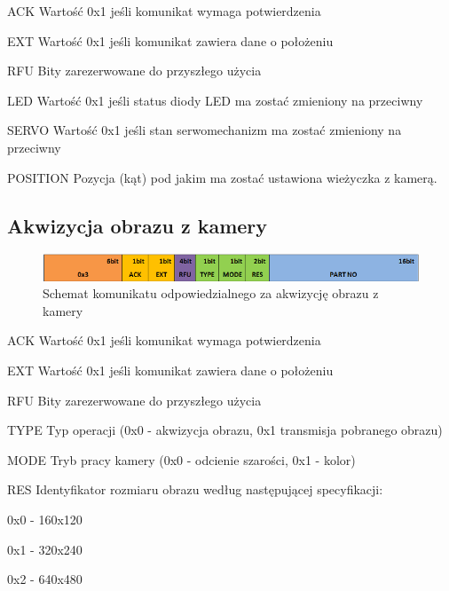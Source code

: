 \begin{basedescript}{\desclabelstyle{\pushlabel}\desclabelwidth{25mm}}
\setlength{\parsep}{0pt}
\setlength{\itemsep}{0mm}
\setlength{\parskip}{0pt}
\item[ACK]
	Wartość 0x1 jeśli komunikat wymaga potwierdzenia
\item[EXT] 
	Wartość 0x1 jeśli komunikat zawiera dane o położeniu
\item[RFU] 
	Bity zarezerwowane do przyszłego użycia
\item[LED] 
	Wartość 0x1 jeśli status diody LED ma zostać zmieniony na przeciwny
\item[SERVO] 
	Wartość 0x1 jeśli stan serwomechanizm ma zostać zmieniony na przeciwny
\item[POSITION] 
	Pozycja (kąt) pod jakim ma zostać ustawiona wieżyczka z kamerą.
\end{basedescript}

\subsection{Akwizycja obrazu z kamery}
\begin{figure}[h!] 
 \centering
 \includegraphics[width=\textwidth]{../images/appendix/cmd_0x03.png}
 \caption{Schemat komunikatu odpowiedzialnego za akwizycję obrazu z kamery}
 \label{fig:CMD_0x03}
\end{figure}

\begin{basedescript}{\desclabelstyle{\pushlabel}\desclabelwidth{25mm}}
\setlength{\parsep}{0pt}
\setlength{\itemsep}{0mm}
\setlength{\parskip}{0pt}
\item[ACK]
	Wartość 0x1 jeśli komunikat wymaga potwierdzenia
\item[EXT] 
	Wartość 0x1 jeśli komunikat zawiera dane o położeniu
\item[RFU] 
	Bity zarezerwowane do przyszłego użycia
\item[TYPE] 
	Typ operacji (0x0 - akwizycja obrazu, 0x1 transmisja pobranego obrazu)
\item[MODE] 
	Tryb pracy kamery (0x0 - odcienie szarości, 0x1 - kolor)
\item[RES] 
	Identyfikator rozmiaru obrazu według następującej specyfikacji:
	\begin{desc}
	\item[0x0] - 160x120
	\item[0x1] - 320x240
	\item[0x2] - 640x480
	\end{desc} 
\end{basedescript}

